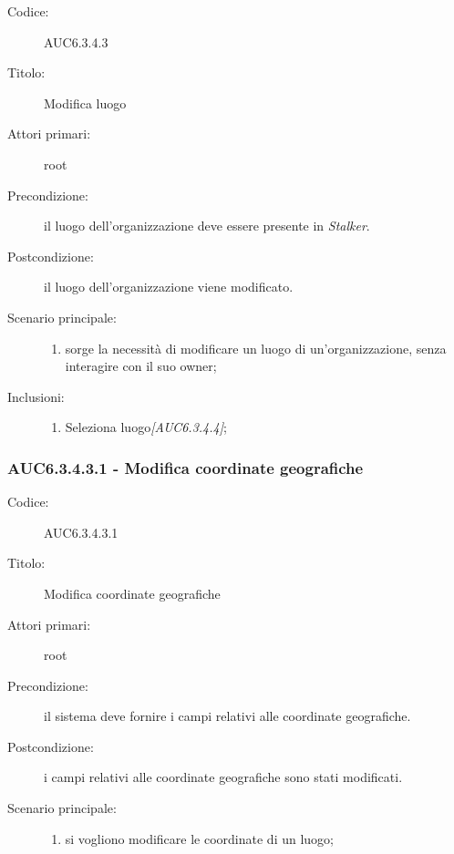 \documentclass[casi-duso]{subfiles}
\begin{document}
\begin{description}
  \item[Codice:] AUC6.3.4.3
  \item[Titolo:] Modifica luogo
  \item[Attori primari:] root
  \item[Precondizione:] il luogo dell'organizzazione deve essere presente in \emph{Stalker}.
  \item[Postcondizione:] il luogo dell'organizzazione viene modificato.
  \item[Scenario principale:]
  \begin{enumerate}
    \item sorge la necessità di modificare un luogo di un'organizzazione, senza interagire con il suo owner;
  \end{enumerate}
  \item[Inclusioni:]
  \begin{enumerate}
    \item Seleziona luogo\emph{[AUC6.3.4.4]};
  \end{enumerate}
\end{description}

\subsubsection{AUC6.3.4.3.1 - Modifica coordinate geografiche}%
\label{subsub:AUC6.3.4.3.1}
\begin{description}
  \item[Codice:] AUC6.3.4.3.1
  \item[Titolo:] Modifica coordinate geografiche
  \item[Attori primari:] root
  \item[Precondizione:] il sistema deve fornire i campi relativi alle coordinate geografiche.
  \item[Postcondizione:] i campi relativi alle coordinate geografiche sono stati modificati.
  \item[Scenario principale:]
  \begin{enumerate}
    \item si vogliono modificare le coordinate di un luogo;
  \end{enumerate}
\end{description}
\end{document}
